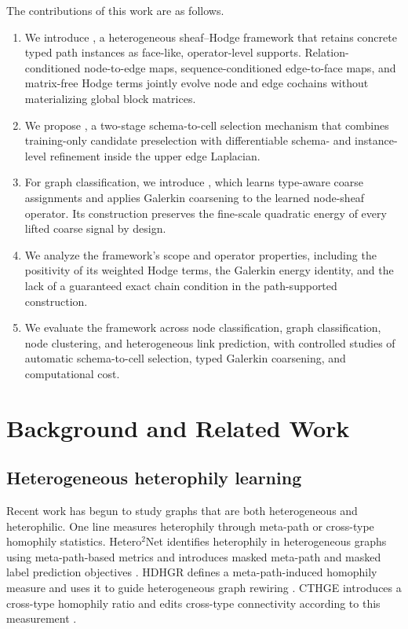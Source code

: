 The contributions of this work are as follows.
\begin{enumerate}
  \item We introduce \method{}, a heterogeneous sheaf--Hodge framework that retains concrete typed
  path instances as face-like, operator-level supports. Relation-conditioned node-to-edge maps,
  sequence-conditioned edge-to-face maps, and matrix-free Hodge terms jointly evolve node and edge
  cochains without materializing global block matrices.
  \item We propose \ampss{}, a two-stage schema-to-cell selection mechanism that combines
  training-only candidate preselection with differentiable schema- and instance-level refinement
  inside the upper edge Laplacian.
  \item For graph classification, we introduce \thspool{}, which learns type-aware coarse
  assignments and applies Galerkin coarsening to the learned node-sheaf operator. Its construction
  preserves the fine-scale quadratic energy of every lifted coarse signal by design.
  \item We analyze the framework's scope and operator properties, including the positivity of its
  weighted Hodge terms, the Galerkin energy identity, and the lack of a guaranteed exact chain
  condition in the path-supported construction.
  \item We evaluate the framework across node classification, graph classification, node
  clustering, and heterogeneous link prediction, with controlled studies of automatic
  schema-to-cell selection, typed Galerkin coarsening, and computational cost.
\end{enumerate}


\section{Background and Related Work}
\label{sec:background}
\subsection{Heterogeneous heterophily learning}

Recent work has begun to study graphs that are both heterogeneous and heterophilic. 
One line measures heterophily through meta-path or cross-type homophily statistics. 
Hetero$^2$Net identifies heterophily in heterogeneous graphs using meta-path-based metrics and introduces masked meta-path and masked label prediction objectives \cite{li2023hetero2net}. 
HDHGR defines a meta-path-induced homophily measure and uses it to guide heterogeneous graph rewiring \cite{guo2023hdhgr}. 
CTHGE introduces a cross-type homophily ratio and edits cross-type connectivity according to this measurement \cite{tao2025cthge}.

